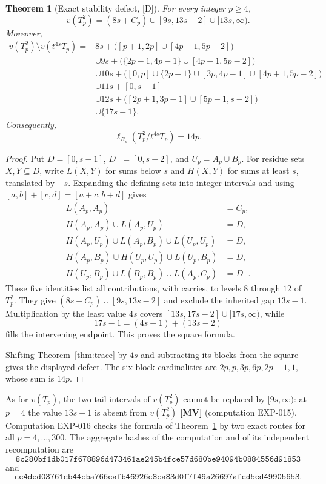 \documentclass[11pt]{article}
\newtheorem{theorem}{Theorem}[section]
\theoremstyle{definition}
\theoremstyle{remark}
\begin{document}
\begin{theorem}[Exact stability defect, {[D]}]\label{thm:stability}
For every integer $p\ge4$,
\[
v(T_p^2)=(8s+C_p)\cup[9s,13s-2]\cup[13s,\infty).
\]
Moreover,
\begin{align*}
v(T_p^2)\setminus v(t^{4s}T_p)={}&
8s+\bigl([p+1,2p]\cup[4p-1,5p-2]\bigr)\\
&\cup9s+\bigl(\{2p-1,4p-1\}\cup[4p+1,5p-2]\bigr)\\
&\cup10s+\bigl([0,p]\cup\{2p-1\}\cup[3p,4p-1]
                 \cup[4p+1,5p-2]\bigr)\\
&\cup11s+[0,s-1]\\
&\cup12s+\bigl([2p+1,3p-1]\cup[5p-1,s-2]\bigr)\\
&\cup\{17s-1\}.
\end{align*}
Consequently,
\[
\ell_{R_p}(T_p^2/t^{4s}T_p)=14p.
\]
\end{theorem}
\begin{proof}
Put $D=[0,s-1]$, $D^-=[0,s-2]$, and $U_p=A_p\cup B_p$. For residue sets $X,Y\subseteq D$,
write $L(X,Y)$ for sums below $s$ and $H(X,Y)$ for sums at least $s$, translated by $-s$.
Expanding the defining sets into integer intervals and using
$[a,b]+[c,d]=[a+c,b+d]$ gives
\begin{align*}
L(A_p,A_p)&=C_p,\\
H(A_p,A_p)\cup L(A_p,U_p)&=D,\\
H(A_p,U_p)\cup L(A_p,B_p)\cup L(U_p,U_p)&=D,\\
H(A_p,B_p)\cup H(U_p,U_p)\cup L(U_p,B_p)&=D,\\
H(U_p,B_p)\cup L(B_p,B_p)\cup L(A_p,C_p)&=D^-.
\end{align*}
These five identities list all contributions, with carries, to levels $8$ through $12$ of
$T_p^2$. They give $(8s+C_p)\cup[9s,13s-2]$ and exclude the inherited gap $13s-1$.
Multiplication by the least value $4s$ covers $[13s,17s-2]\cup[17s,\infty)$, while
\[
17s-1=(4s+1)+(13s-2)
\]
fills the intervening endpoint. This proves the square formula.

Shifting Theorem~\ref{thm:trace} by $4s$ and subtracting its blocks from the square gives the
displayed defect. The six block cardinalities are $2p,p,3p,6p,2p-1,1$, whose sum is $14p$.
\end{proof}

As for $v(T_p)$, the two tail intervals of $v(T_p^2)$ cannot be replaced by $[9s,\infty)$: at
$p=4$ the value $13s-1$ is absent from $v(T_p^2)$ \textbf{[MV]} (computation EXP-015). Computation
EXP-016 checks the formula of Theorem~\ref{thm:stability} by two exact routes for all
$p=4,\ldots,300$. The aggregate hashes of the computation and of its independent recomputation are
\[
\texttt{8c280bf1db017f678896d473461ae245b4fce57d680be94094b0884556d91853}
\]
and
\[
\texttt{ce4ded03761eb44cba766eafb46926c8ca83d0f7f49a26697afed5ed49905653}.
\]
\end{document}
